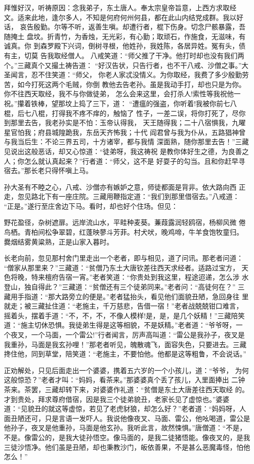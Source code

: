 拜惟好汉，听祷原因：念我弟子，东土唐人。奉太宗皇帝旨意，上西方求取经
文。适来此地，逢尔多人，不知是何府何州何县，都在此山内结党成群。我以好话，
哀告殷勤。尔等不听，返善生嗔。却遭行者，棍下伤身。切念尸骸暴露，吾随掩土
盘坟。折青竹，为香烛，无光彩，有心勤；取顽石，作施食，无滋味，有诚真。你
到森罗殿下兴词，倒树寻根，他姓孙，我姓陈，各居异姓。冤有头，债有主，切莫
告我取经僧人。
八戒笑道：“师父推了干净。他打时却也没有我们两个。”三藏真个又撮土祷告道：
“好汉告状，只告行者，也不干八戒、沙僧之事。”大圣闻言，忍不住笑道：“师父，
你老人家忒没情义。为你取经，我费了多少殷勤劳苦，如今打死这两个毛贼，你倒
教他去告老孙。虽是我动手打，却也只是为你。你不往西天取经，我不与你做徒弟，
怎么会来这里，会打杀人!索性等我祝他一祝。”攥着铁棒，望那坟上捣了三下，道：
“遭瘟的强盗，你听着!我被你前七八棍，后七八棍，打得我不疼不痒的，触恼了
性子，一差二误，将你打死了，尽你到那里去告，我老孙实是不怕：玉帝认得我，
天王随得我；二十八宿惧我，九曜星官怕我；府县城隍跪我，东岳天齐怖我；十代
阎君曾与我为仆从，五路猖神曾与我当后生：不论三界五司，十方诸宰，都与我情
深面熟，随你那里去告！”三藏见说出这般恶话，却又心惊道：“徒弟呀，我这祷祝
是教你体好生之德，为良善之人；你怎么就认真起来？”行者道：“师父，这不是
好耍子的勾当。且和你赶早寻宿去。”那长老只得怀嗔上马。

孙大圣有不睦之心，八戒、沙僧亦有嫉妒之意，师徒都面是背非。依大路向西
正走，忽见路北下有一座庄院。三藏用鞭指定道：“我们到那里借宿去。”八戒道：
“正是。”遂行至庄舍边下马。看时，却也好个住场。但见：

野花盈径，杂树遮扉。远岸流山水，平畦种麦葵。蒹葭露润轻鸥宿，杨柳风微
倦鸟栖。青柏间松争翠碧，红蓬映蓼斗芳菲。村犬吠，晚鸡啼，牛羊食饱牧童归。
爨烟结雾黄粱熟，正是山家入暮时。

长老向前，忽见那村舍门里走出一个老者，即与相见，道了问讯。那老者问道：
“僧家从那里来？”三藏道：“贫僧乃东土大唐钦差往西天求经者。适路过宝方，
天色将晚，特来檀府告宿一宵。”老者笑道：“你贵处到我这里，程途迢递，怎么涉
水登山，独自得此？”三藏道：“贫僧还有三个徒弟同来。”老者问：“高徒何在？”
三藏用手指道：“那大路旁立的便是。”老者猛抬头，看见他们面貌丑陋，急回身往
里就走；被三藏扯住道：“老施主，千万慈悲，告借一宿！”老者战兢兢钳口难言，
摇着头，摆着手道：“不，不，不，不像人模样!是，是，是几个妖精！”三藏陪笑
道：“施主切休恐惧。我徒弟生得是这等相貌，不是妖精。”老者道：“爷爷呀，一
个夜叉，一个马面，一个雷公!”行者闻言，厉声高叫道：“雷公是我孙子，夜叉是
我重孙，马面是我玄孙哩！”那老者听见，魄散魂飞，面容失色，只要进去。三藏
搀住他，同到草堂，陪笑道：“老施主，不要怕他。他都是这等粗鲁，不会说话。”

正劝解处，只见后面走出一个婆婆，携着五六岁的一个小孩儿，道：“爷爷，
为何这般惊恐？”老者才叫：“妈妈，看茶来。”那婆婆真个丢了孩儿，入里面捧出
二钟茶来。茶罢，三藏却转下来，对婆婆作礼道：“贫僧是东土大唐差往西天取经
的。才到贵处，拜求尊府借宿，因是我三个徒弟貌丑，老家长见了虚惊也。”婆婆
道：“见貌丑的就这等虚惊，若见了老虎豺狼，却怎么好？”老者道：“妈妈呀，人
面丑陋还可，只是言语一发吓人。我说他像夜叉、马面、雷公，他吆喝道，雷公是
他孙子，夜叉是他重孙，马面是他玄孙。我听此言，故然悚惧。”唐僧道：“不是，
不是。像雷公的，是我大徒孙悟空。像马面的，是我二徒猪悟能。像夜叉的，是我
三徒沙悟净。他们虽是丑陋，却也秉教沙门，皈依善果，不是甚么恶魔毒怪，怕他
怎么！”

